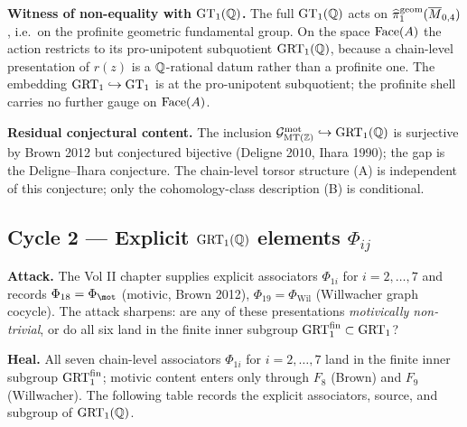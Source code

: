 \textbf{Witness of non-equality with $\mathrm{GT}_1(\mathbb{Q})$.} The full
$\mathrm{GT}_1(\mathbb{Q})$ acts on $\widehat{\pi}_1^{\mathrm{geom}}(\overline{M}_{0,4})$,
i.e.\ on the profinite geometric fundamental group. On the space
$\mathrm{Face}(A)$ the action restricts to its pro-unipotent subquotient
$\mathrm{GRT}_1(\mathbb{Q})$, because a chain-level presentation of $r(z)$ is a
$\mathbb{Q}$-rational datum rather than a profinite one. The embedding
$\mathrm{GRT}_1 \hookrightarrow \mathrm{GT}_1$ is at the pro-unipotent subquotient; the
profinite shell carries no further gauge on $\mathrm{Face}(A)$.

\textbf{Residual conjectural content.} The inclusion
$\mathcal{G}^{\mathrm{mot}}_{\mathrm{MT}(\mathbb{Z})} \hookrightarrow \mathrm{GRT}_1(\mathbb{Q})$ is surjective by
Brown 2012 but conjectured bijective (Deligne 2010, Ihara 1990); the
gap is the Deligne--Ihara conjecture. The chain-level torsor structure
(A) is independent of this conjecture; only the cohomology-class
description (B) is conditional.

\subsection*{Cycle 2 --- Explicit $\mathrm{GRT}_1(\mathbb{Q})$ elements $\Phi_{ij}$}

\textbf{Attack.} The Vol II chapter supplies explicit associators
$\Phi_{1i}$ for $i = 2, \dots, 7$ and records $\Phi_{18} = \Phi_{\mot}$
(motivic, Brown 2012), $\Phi_{19} = \Phi_{\mathrm{Wil}}$ (Willwacher
graph cocycle). The attack sharpens: are any of these presentations
\emph{motivically non-trivial}, or do all six land in the finite inner
subgroup $\mathrm{GRT}_1^{\mathrm{fin}} \subset \mathrm{GRT}_1$?

\textbf{Heal.} All seven chain-level associators $\Phi_{1i}$ for
$i = 2, \dots, 7$ land in the finite inner subgroup
$\mathrm{GRT}_1^{\mathrm{fin}}$; motivic content enters only through $F_8$
(Brown) and $F_9$ (Willwacher). The following table records the
explicit associators, source, and subgroup of $\mathrm{GRT}_1(\mathbb{Q})$.

